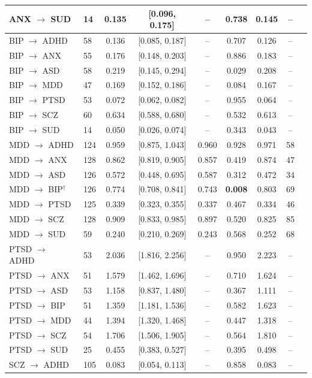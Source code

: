 \documentclass[11pt]{article}
\begin{document}
\begin{table}[h]
\begin{tabular}{llccccccc}
ANX $\to$ SUD & 14 & 0.135 & [0.096, 0.175] & -- & 0.738 & 0.145 & -- \\
\midrule
BIP $\to$ ADHD & 58 & 0.136 & [0.085, 0.187] & -- & 0.707 & 0.126 & -- \\
BIP $\to$ ANX & 55 & 0.176 & [0.148, 0.203] & -- & 0.886 & 0.183 & -- \\
BIP $\to$ ASD & 58 & 0.219 & [0.145, 0.294] & -- & 0.029 & 0.208 & -- \\
BIP $\to$ MDD & 47 & 0.169 & [0.152, 0.186] & -- & 0.084 & 0.167 & -- \\
BIP $\to$ PTSD & 53 & 0.072 & [0.062, 0.082] & -- & 0.955 & 0.064 & -- \\
BIP $\to$ SCZ & 60 & 0.634 & [0.588, 0.680] & -- & 0.532 & 0.613 & -- \\
BIP $\to$ SUD & 14 & 0.050 & [0.026, 0.074] & -- & 0.343 & 0.043 & -- \\
\midrule
MDD $\to$ ADHD & 124 & 0.959 & [0.875, 1.043] & 0.960 & 0.928 & 0.971 & 58 \\
MDD $\to$ ANX & 128 & 0.862 & [0.819, 0.905] & 0.857 & 0.419 & 0.874 & 47 \\
MDD $\to$ ASD & 126 & 0.572 & [0.448, 0.695] & 0.587 & 0.312 & 0.472 & 34 \\
MDD $\to$ BIP$^{\dagger}$ & 126 & 0.774 & [0.708, 0.841] & 0.743 & \textbf{0.008} & 0.803 & 69 \\
MDD $\to$ PTSD & 125 & 0.339 & [0.323, 0.355] & 0.337 & 0.467 & 0.334 & 46 \\
MDD $\to$ SCZ & 128 & 0.909 & [0.833, 0.985] & 0.897 & 0.520 & 0.825 & 85 \\
MDD $\to$ SUD & 59 & 0.240 & [0.210, 0.269] & 0.243 & 0.568 & 0.252 & 68 \\
\midrule
PTSD $\to$ ADHD & 53 & 2.036 & [1.816, 2.256] & -- & 0.950 & 2.223 & -- \\
PTSD $\to$ ANX & 51 & 1.579 & [1.462, 1.696] & -- & 0.710 & 1.624 & -- \\
PTSD $\to$ ASD & 53 & 1.158 & [0.837, 1.480] & -- & 0.367 & 1.111 & -- \\
PTSD $\to$ BIP & 51 & 1.359 & [1.181, 1.536] & -- & 0.582 & 1.623 & -- \\
PTSD $\to$ MDD & 44 & 1.394 & [1.320, 1.468] & -- & 0.447 & 1.318 & -- \\
PTSD $\to$ SCZ & 54 & 1.706 & [1.506, 1.905] & -- & 0.564 & 1.810 & -- \\
PTSD $\to$ SUD & 25 & 0.455 & [0.383, 0.527] & -- & 0.395 & 0.498 & -- \\
\midrule
SCZ $\to$ ADHD & 105 & 0.083 & [0.054, 0.113] & -- & 0.858 & 0.083 & -- \\

\end{tabular}
\end{table}
\end{document}
